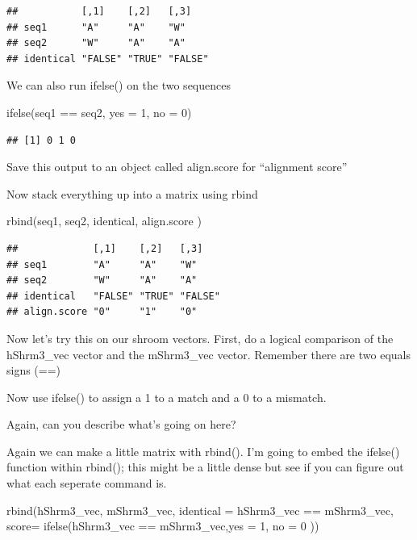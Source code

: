 \documentclass[
]{book}
\newenvironment{Shaded}{\begin{snugshade}}{\end{snugshade}}
\newcommand{\AttributeTok}[1]{\textcolor[rgb]{0.77,0.63,0.00}{#1}}
\newcommand{\DecValTok}[1]{\textcolor[rgb]{0.00,0.00,0.81}{#1}}
\newcommand{\FunctionTok}[1]{\textcolor[rgb]{0.00,0.00,0.00}{#1}}
\newcommand{\NormalTok}[1]{#1}
\newcommand{\SpecialCharTok}[1]{\textcolor[rgb]{0.00,0.00,0.00}{#1}}
\begin{document}
\begin{verbatim}
##           [,1]    [,2]   [,3]   
## seq1      "A"     "A"    "W"    
## seq2      "W"     "A"    "A"    
## identical "FALSE" "TRUE" "FALSE"
\end{verbatim}

We can also run ifelse() on the two sequences

\begin{Shaded}
\begin{Highlighting}[]
\FunctionTok{ifelse}\NormalTok{(seq1 }\SpecialCharTok{==}\NormalTok{ seq2, }\AttributeTok{yes =} \DecValTok{1}\NormalTok{, }\AttributeTok{no =} \DecValTok{0}\NormalTok{)}
\end{Highlighting}
\end{Shaded}

\begin{verbatim}
## [1] 0 1 0
\end{verbatim}

Save this output to an object called align.score for ``alignment score''

Now stack everything up into a matrix using rbind

\begin{Shaded}
\begin{Highlighting}[]
\FunctionTok{rbind}\NormalTok{(seq1, seq2, identical, align.score )}
\end{Highlighting}
\end{Shaded}

\begin{verbatim}
##             [,1]    [,2]   [,3]   
## seq1        "A"     "A"    "W"    
## seq2        "W"     "A"    "A"    
## identical   "FALSE" "TRUE" "FALSE"
## align.score "0"     "1"    "0"
\end{verbatim}

Now let's try this on our shroom vectors. First, do a logical comparison of the hShrm3\_vec vector and the mShrm3\_vec vector. Remember there are two equals signs (==)

Now use ifelse() to assign a 1 to a match and a 0 to a mismatch.

Again, can you describe what's going on here?

Again we can make a little matrix with rbind(). I'm going to embed the ifelse() function within rbind(); this might be a little dense but see if you can figure out what each seperate command is.

\begin{Shaded}
\begin{Highlighting}[]
\FunctionTok{rbind}\NormalTok{(hShrm3\_vec, }
\NormalTok{      mShrm3\_vec,}
      \AttributeTok{identical =}\NormalTok{ hShrm3\_vec }\SpecialCharTok{==}\NormalTok{ mShrm3\_vec,}
      \AttributeTok{score=} \FunctionTok{ifelse}\NormalTok{(hShrm3\_vec }\SpecialCharTok{==}\NormalTok{ mShrm3\_vec,}\AttributeTok{yes =} \DecValTok{1}\NormalTok{, }\AttributeTok{no =} \DecValTok{0}\NormalTok{ ))}
\end{Highlighting}
\end{Shaded}
\end{document}
